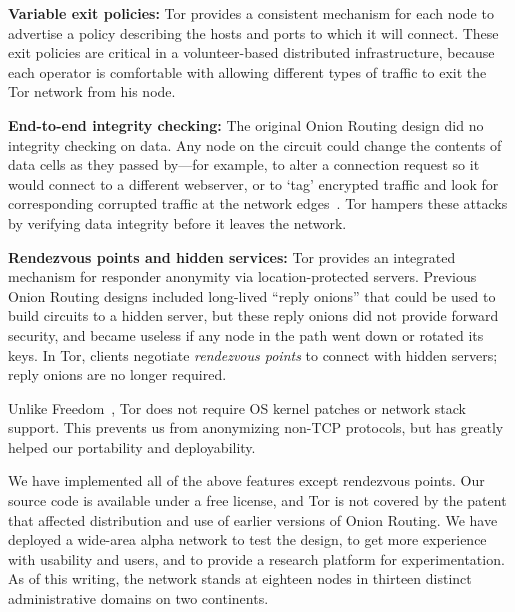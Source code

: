 \documentclass[times,10pt,twocolumn]{article}
\begin{document}
\textbf{Variable exit policies:} Tor provides a consistent mechanism
for each node to advertise a policy describing the hosts
and ports to which it will connect. These exit policies are critical
in a volunteer-based distributed infrastructure, because each operator
is comfortable with allowing different types of traffic to exit the Tor
network from his node.

\textbf{End-to-end integrity checking:} The original Onion Routing
design did no integrity checking on data. Any node on the
circuit could change the contents of data cells as they passed by---for
example, to alter a connection request so it would connect
to a different webserver, or to `tag' encrypted traffic and look for
corresponding corrupted traffic at the network edges~\cite{minion-design}.
Tor hampers these attacks by verifying data integrity before it leaves
the network.


\textbf{Rendezvous points and hidden services:}
Tor provides an integrated mechanism for responder anonymity via
location-protected servers.  Previous Onion Routing designs included
long-lived ``reply onions'' that could be used to build circuits
to a hidden server, but these reply onions did not provide forward
security, and became useless if any node in the path went down
or rotated its keys.  In Tor, clients negotiate {\it rendezvous points}
to connect with hidden servers; reply onions are no longer required.

Unlike Freedom~\cite{freedom2-arch}, Tor does not require OS kernel
patches or network stack support.  This prevents us from anonymizing
non-TCP protocols, but has greatly helped our portability and
deployability.


We have implemented all of the above features except rendezvous
points. Our source code is
available under a free license, and Tor
is not covered by the patent that affected distribution and use of
earlier versions of Onion Routing.
We have deployed a wide-area alpha network
to test the design, to get more experience with usability
and users, and to provide a research platform for experimentation.
As of this writing, the network stands at eighteen nodes in thirteen
distinct administrative domains on two continents.
\end{document}
